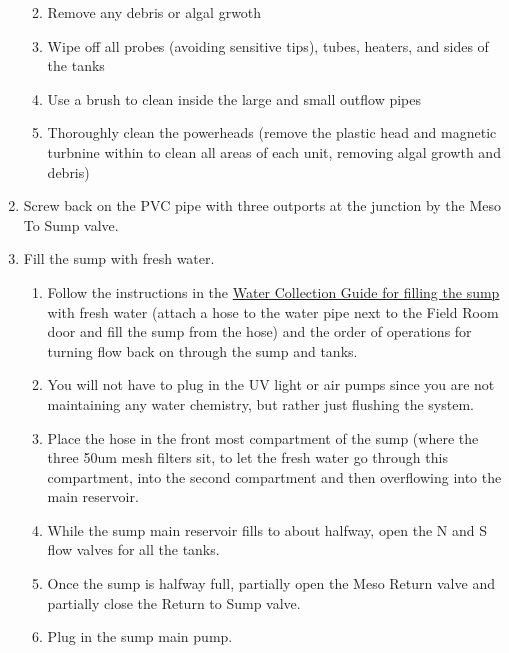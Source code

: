 \documentclass[
]{book}
\providecommand{\tightlist}{%
  \setlength{\itemsep}{0pt}\setlength{\parskip}{0pt}}
\begin{document}
\begin{enumerate}
  \begin{enumerate}
  \def\labelenumii{\arabic{enumii}.}
  \tightlist
  \item
    Remove any debris or algal grwoth
  \item
    Wipe off all probes (avoiding sensitive tips), tubes, heaters, and sides of the tanks
  \item
    Use a brush to clean inside the large and small outflow pipes
  \item
    Thoroughly clean the powerheads (remove the plastic head and magnetic turbnine within to clean all areas of each unit, removing algal growth and debris)
  \end{enumerate}
\item
  Screw back on the PVC pipe with three outports at the junction by the Meso To Sump valve.
\item
  Fill the sump with fresh water.

  \begin{enumerate}
  \def\labelenumii{\arabic{enumii}.}
  \tightlist
  \item
    Follow the instructions in the \href{06-water_collection.md}{Water Collection Guide for filling the sump} with fresh water (attach a hose to the water pipe next to the Field Room door and fill the sump from the hose) and the order of operations for turning flow back on through the sump and tanks.
  \item
    You will not have to plug in the UV light or air pumps since you are not maintaining any water chemistry, but rather just flushing the system.
  \item
    Place the hose in the front most compartment of the sump (where the three 50um mesh filters sit, to let the fresh water go through this compartment, into the second compartment and then overflowing into the main reservoir.
  \item
    While the sump main reservoir fills to about halfway, open the N and S flow valves for all the tanks.
  \item
    Once the sump is halfway full, partially open the Meso Return valve and partially close the Return to Sump valve.
  \item
    Plug in the sump main pump.


\end{enumerate}
\end{enumerate}
\end{document}
